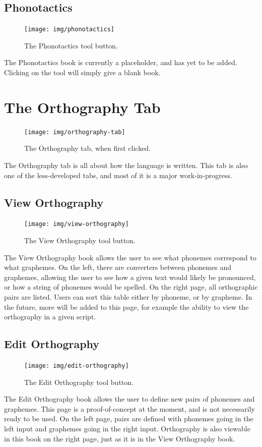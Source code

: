 \documentclass{report}
\begin{document}
	\section{Phonotactics}
	\begin{figure}
		\centering
		\texttt{[image: img/phonotactics]}
		\caption{The Phonotactics tool button.}
		\label{fig:phonotactics}
	\end{figure}
	The Phonotactics book is currently a placeholder, and has yet to be added. Clicking on the tool will simply give a blank book.
	
	\chapter{The Orthography Tab}
	\begin{figure}[ht]
		\centering
		\texttt{[image: img/orthography-tab]}
		\caption{The Orthography tab, when first clicked.}
		\label{fig:orthography-tab}
	\end{figure}
	The Orthography tab is all about how the language is written. This tab is also one of the less-developed tabs, and most of it is a major work-in-progress.
	\newpage
	\section{View Orthography}
	\begin{figure}
		\centering
		\texttt{[image: img/view-orthography]}
		\caption{The View Orthography tool button.}
		\label{fig:view-orthography}
	\end{figure}
	The View Orthography book allows the user to see what phonemes correspond to what graphemes. On the left, there are converters between phonemes and graphemes, allowing the user to see how a given text would likely be pronounced, or how a string of phonemes would be spelled. On the right page, all orthographic pairs are listed. Users can sort this table either by phoneme, or by grapheme. In the future, more will be added to this page, for example the ability to view the orthography in a given script.
	\section{Edit Orthography}
	\begin{figure}
		\centering
		\texttt{[image: img/edit-orthography]}
		\caption{The Edit Orthography tool button.}
		\label{fig:edit-orthography}
	\end{figure}
	The Edit Orthography book allows the user to define new pairs of phonemes and graphemes. This page is a proof-of-concept at the moment, and is not necessarily ready to be used. On the left page, pairs are defined with phonemes going in the left input and graphemes going in the right input. Orthography is also viewable in this book on the right page, just as it is in the View Orthography book.
\end{document}
